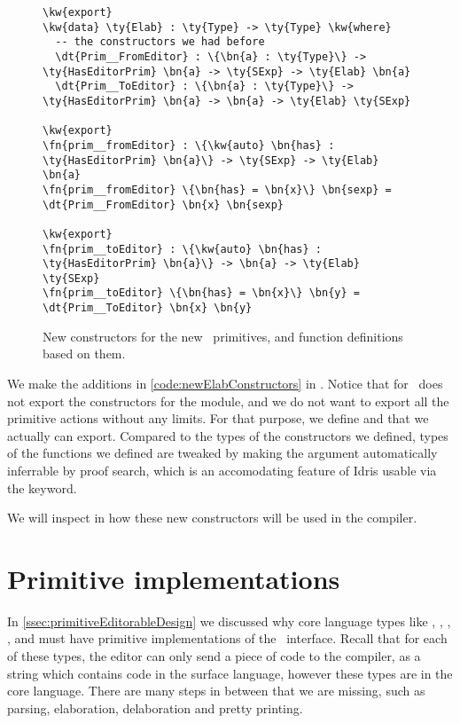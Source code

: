 \begin{figure}[ht]
\caption{New constructors for the new \Elab\ primitives, and function definitions based on them.}
  \label{code:newElabConstructors}
\begin{Verbatim}[framesep=2mm, label=\footnotesize{\normalfont{Idris}}, labelposition=topline]
\kw{export}
\kw{data} \ty{Elab} : \ty{Type} -> \ty{Type} \kw{where}
  -- the constructors we had before
  \dt{Prim__FromEditor} : \{\bn{a} : \ty{Type}\} -> \ty{HasEditorPrim} \bn{a} -> \ty{SExp} -> \ty{Elab} \bn{a}
  \dt{Prim__ToEditor} : \{\bn{a} : \ty{Type}\} -> \ty{HasEditorPrim} \bn{a} -> \bn{a} -> \ty{Elab} \ty{SExp}

\kw{export}
\fn{prim__fromEditor} : \{\kw{auto} \bn{has} : \ty{HasEditorPrim} \bn{a}\} -> \ty{SExp} -> \ty{Elab} \bn{a}
\fn{prim__fromEditor} \{\bn{has} = \bn{x}\} \bn{sexp} = \dt{Prim__FromEditor} \bn{x} \bn{sexp}

\kw{export}
\fn{prim__toEditor} : \{\kw{auto} \bn{has} : \ty{HasEditorPrim} \bn{a}\} -> \bn{a} -> \ty{Elab} \ty{SExp}
\fn{prim__toEditor} \{\bn{has} = \bn{x}\} \bn{y} = \dt{Prim__ToEditor} \bn{x} \bn{y}
\end{Verbatim}
\end{figure}

We make the additions in \autoref{code:newElabConstructors} in \LRE.  Notice
that  for \Elab\ does not export the constructors for the module,
and we do not want to export all the primitive actions without any limits. For
that purpose, we define  and  that
we actually can export. Compared to the types of the constructors we defined,
types of the functions we defined are tweaked by making the 
argument automatically inferrable by proof search, which is
an accomodating feature of Idris usable via the  keyword.

We will inspect in \label{sec:primitiveEditorableImpl} how these new
constructors will be used in the compiler.

\section{Primitive  implementations}\label{sec:primitiveEditorableImpl}

In \autoref{ssec:primitiveEditorableDesign} we discussed why core language
types like , , , , and
 must have primitive implementations of the
\Editorable\ interface. Recall that for each of these types, the editor can
only send a piece of code to the compiler, as a string which contains code in
the surface language, however these types are in the core language. There are
many steps in between that we are missing, such as parsing, elaboration,
delaboration and pretty printing.

